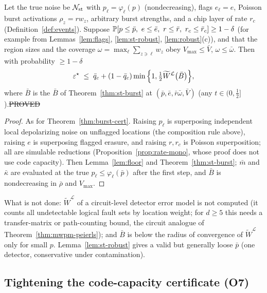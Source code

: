 \begin{theorem}\label{thm:st-cert}
Let the true noise be $\mathcal{N}_{\rm st}$ with $p_\ell=\varphi_\ell(p)$ (nondecreasing), flags $e_\ell=e$, Poisson burst activations $\rho_z=r w_z$, arbitrary burst strengths, and a chip layer of rate $r_c$ (Definition~\ref{def:events}). Suppose $\Prob[p\le\bar p,\ e\le\bar e,\ r\le\bar r,\ r_c\le\bar r_c]\ge1-\delta$ (for example from Lemmas~\ref{lem:flags}, \ref{lem:st-robust}, \ref{lem:robust}(c)), and that the region sizes and the coverage $\omega=\max_\ell\sum_{z\ni\ell}w_z$ obey $V_{\max}\le\bar V$, $\omega\le\bar\omega$. Then with probability $\ge1-\delta$
\[
\varepsilon^{\star}\;\le\;\bar q_c+(1-\bar q_c)\min\Big\{1,\tfrac12\widetilde W^{\mathcal L}\big(\bar B\big)\Big\},
\]
where $\bar B$ is the $\bar B$ of Theorem~\ref{thm:st-burst} at $(\bar p,\bar e,\bar r\bar\omega,\bar V)$ (any $t\in(0,\tfrac12]$).\hfill\st{PROVED}
\end{theorem}
\begin{proof}
As for Theorem~\ref{thm:burst-cert}. Raising $p_\ell$ is superposing independent local depolarizing noise on unflagged locations (the composition rule above), raising $e$ is superposing flagged erasure, and raising $r,r_c$ is Poisson superposition; all are simulable reductions (Proposition~\ref{prop:rate-mono}, whose proof does not use code capacity). Then Lemma~\ref{lem:floor} and Theorem~\ref{thm:st-burst}; $\bar m$ and $\bar\kappa$ are evaluated at the true $p_\ell\le\varphi_\ell(\bar p)$ after the first step, and $\bar B$ is nondecreasing in $\bar\rho$ and $V_{\max}$.
\end{proof}

\noindent What is not done: $\widetilde W^{\mathcal L}$ of a circuit-level detector error model is not computed (it counts all undetectable logical fault sets by location weight; for $d\ge5$ this needs a transfer-matrix or path-counting bound, the circuit analogue of Theorem~\ref{thm:mwpm-peierls}); and $\bar B$ is below the radius of convergence of $\widetilde W^{\mathcal L}$ only for small $p$. Lemma~\ref{lem:st-robust} gives a valid but generally loose $\bar p$ (one detector, conservative under contamination).

\subsection{Tightening the code-capacity certificate (O7)}\label{sec:o7}


